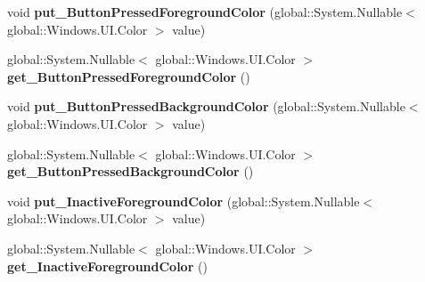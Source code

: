 \begin{DoxyCompactItemize}
\item 
\mbox{\label{interface_windows_1_1_u_i_1_1_view_management_1_1_i_application_view_title_bar_a29ef0f6fbb437d94eb34a95316b5cdba}} 
void {\bfseries put\+\_\+\+Button\+Pressed\+Foreground\+Color} (global\+::\+System.\+Nullable$<$ global\+::\+Windows.\+U\+I.\+Color $>$ value)
\item 
\mbox{\label{interface_windows_1_1_u_i_1_1_view_management_1_1_i_application_view_title_bar_a8ad9bacae46b56506f81e856ff93f8d1}} 
global\+::\+System.\+Nullable$<$ global\+::\+Windows.\+U\+I.\+Color $>$ {\bfseries get\+\_\+\+Button\+Pressed\+Foreground\+Color} ()
\item 
\mbox{\label{interface_windows_1_1_u_i_1_1_view_management_1_1_i_application_view_title_bar_a7df9d3750dbac43519af7a923427c6a4}} 
void {\bfseries put\+\_\+\+Button\+Pressed\+Background\+Color} (global\+::\+System.\+Nullable$<$ global\+::\+Windows.\+U\+I.\+Color $>$ value)
\item 
\mbox{\label{interface_windows_1_1_u_i_1_1_view_management_1_1_i_application_view_title_bar_a4ec8314801899bbfbf8d65f31a72dd93}} 
global\+::\+System.\+Nullable$<$ global\+::\+Windows.\+U\+I.\+Color $>$ {\bfseries get\+\_\+\+Button\+Pressed\+Background\+Color} ()
\item 
\mbox{\label{interface_windows_1_1_u_i_1_1_view_management_1_1_i_application_view_title_bar_a7096145457d6fdaffba225526f91e0eb}} 
void {\bfseries put\+\_\+\+Inactive\+Foreground\+Color} (global\+::\+System.\+Nullable$<$ global\+::\+Windows.\+U\+I.\+Color $>$ value)
\item 
\mbox{\label{interface_windows_1_1_u_i_1_1_view_management_1_1_i_application_view_title_bar_ac13bf0f324d499707bcdcf27bf2749b3}} 
global\+::\+System.\+Nullable$<$ global\+::\+Windows.\+U\+I.\+Color $>$ {\bfseries get\+\_\+\+Inactive\+Foreground\+Color} ()

\end{DoxyCompactItemize}
